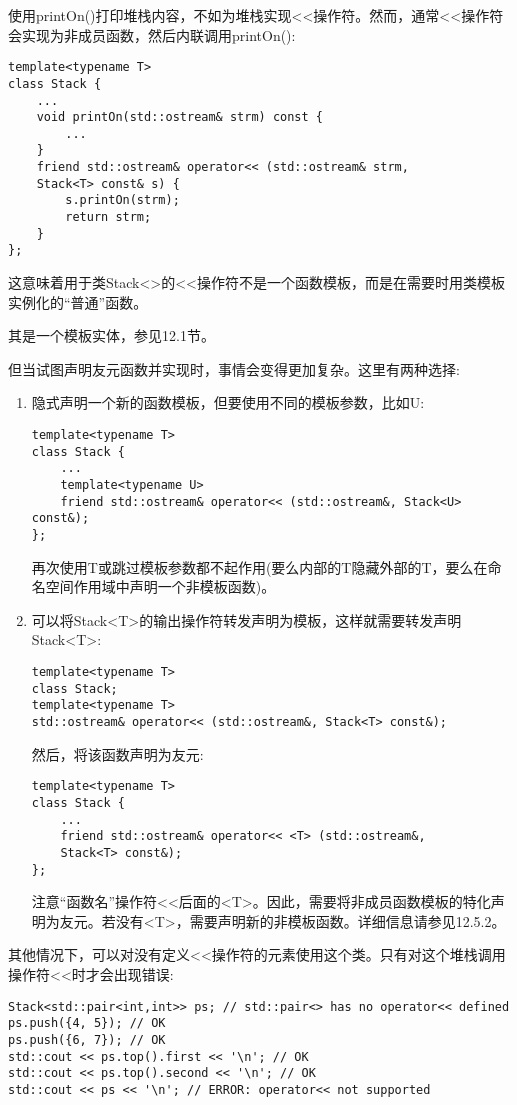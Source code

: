 
使用printOn()打印堆栈内容，不如为堆栈实现<{}<操作符。然而，通常<{}<操作符会实现为非成员函数，然后内联调用printOn():

\begin{lstlisting}[style=styleCXX]
template<typename T>
class Stack {
	...
	void printOn(std::ostream& strm) const {
		...
	}
	friend std::ostream& operator<< (std::ostream& strm,
	Stack<T> const& s) {
		s.printOn(strm);
		return strm;
	}
};
\end{lstlisting}

这意味着用于类Stack<>的<{}<操作符不是一个函数模板，而是在需要时用类模板实例化的“普通”函数。

\begin{tcolorbox}[colback=webgreen!5!white,colframe=webgreen!75!black]
\hspace*{0.75cm}其是一个模板实体，参见12.1节。
\end{tcolorbox}

但当试图声明友元函数并实现时，事情会变得更加复杂。这里有两种选择:

\begin{enumerate}
\item 
隐式声明一个新的函数模板，但要使用不同的模板参数，比如U:

\begin{lstlisting}[style=styleCXX]
template<typename T>
class Stack {
	...
	template<typename U>
	friend std::ostream& operator<< (std::ostream&, Stack<U> const&);
};
\end{lstlisting}

再次使用T或跳过模板参数都不起作用(要么内部的T隐藏外部的T，要么在命名空间作用域中声明一个非模板函数)。

\item 
可以将Stack<T>的输出操作符转发声明为模板，这样就需要转发声明Stack<T>:

\begin{lstlisting}[style=styleCXX]
template<typename T>
class Stack;
template<typename T>
std::ostream& operator<< (std::ostream&, Stack<T> const&);
\end{lstlisting}

然后，将该函数声明为友元:

\begin{lstlisting}[style=styleCXX]
template<typename T>
class Stack {
	...
	friend std::ostream& operator<< <T> (std::ostream&,
	Stack<T> const&);
};
\end{lstlisting}

注意“函数名”操作符<{}<后面的<T>。因此，需要将非成员函数模板的特化声明为友元。若没有<T>，需要声明新的非模板函数。详细信息请参见12.5.2。
\end{enumerate}

其他情况下，可以对没有定义<{}<操作符的元素使用这个类。只有对这个堆栈调用操作符<{}<时才会出现错误:

\begin{lstlisting}[style=styleCXX]
Stack<std::pair<int,int>> ps; // std::pair<> has no operator<< defined
ps.push({4, 5}); // OK
ps.push({6, 7}); // OK
std::cout << ps.top().first << '\n'; // OK
std::cout << ps.top().second << '\n'; // OK
std::cout << ps << '\n'; // ERROR: operator<< not supported
\end{lstlisting}




